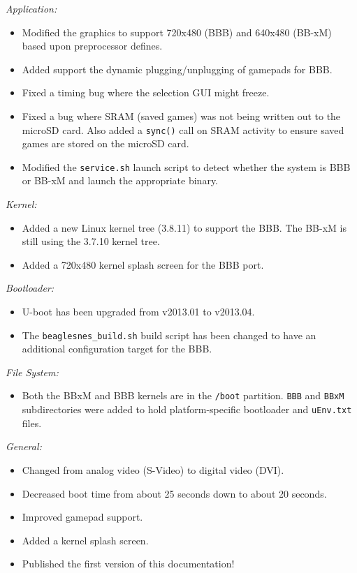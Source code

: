 \noindent{}\emph{Application:}
\begin{itemize}
\item Modified the graphics to support 720x480 (BBB) and 640x480 (BB-xM) based upon preprocessor defines.
\item Added support the dynamic plugging/unplugging of gamepads for BBB.
\item Fixed a timing bug where the selection GUI might freeze.
\item Fixed a bug where SRAM (saved games) was not being written out to the microSD card. Also added a \texttt{sync()} call on SRAM activity to ensure saved games are stored on the microSD card.
\item Modified the \texttt{service.sh} launch script to detect whether the system is BBB or BB-xM and launch the appropriate binary.
\end{itemize}

\noindent{}\emph{Kernel:}
\begin{itemize}
\item Added a new Linux kernel tree (3.8.11) to support the BBB.  The BB-xM is still using the 3.7.10 kernel tree.
\item Added a 720x480 kernel splash screen for the BBB port.
\end{itemize}

\noindent{}\emph{Bootloader:}
\begin{itemize}
\item U-boot has been upgraded from v2013.01 to v2013.04.
\item The \texttt{beaglesnes\_build.sh} build script has been changed to have an additional configuration target for the BBB.
\end{itemize}

\noindent{}\emph{File System:}
\begin{itemize}
\item Both the BBxM and BBB kernels are in the \texttt{/boot} partition.  \texttt{BBB} and \texttt{BBxM} subdirectories were added to hold platform-specific bootloader and \texttt{uEnv.txt} files.
\end{itemize}


\noindent{}\emph{General:}
\begin{itemize}
\item Changed from analog video (S-Video) to digital video (DVI).
\item Decreased boot time from about 25 seconds down to about 20 seconds.
\item Improved gamepad support.
\item Added a kernel splash screen.
\item Published the first version of this documentation!
\end{itemize}

